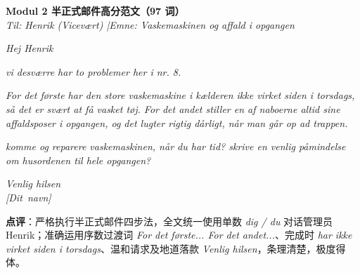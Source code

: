 \begin{answerbox}
\textbf{Modul 2 半正式邮件高分范文（97 词）}\\
\textit{Til: Henrik (Vicevært) \quad|\quad Emne: Vaskemaskinen og affald i opgangen}

\textit{Hej Henrik}

\textit{ vi desværre har to problemer her i nr. 8.}

\textit{For det første har den store vaskemaskine i kælderen ikke virket siden i torsdags, så det er svært at få vasket tøj. For det andet stiller en af naboerne altid sine affaldsposer i opgangen, og det lugter rigtig dårligt, når man går op ad trappen.}

\textit{ komme og reparere vaskemaskinen, når du har tid?  skrive en venlig påmindelse om husordenen til hele opgangen?}

\textit{}

\textit{Venlig hilsen\\
\mbox{[Dit navn]}}

\small\textbf{点评}：严格执行半正式邮件四步法，全文统一使用单数 \textit{dig / du} 对话管理员 Henrik；准确运用序数过渡词 \textit{For det første... For det andet...}、完成时 \textit{har ikke virket siden i torsdags}、温和请求及地道落款 \textit{Venlig hilsen}，条理清楚，极度得体。
\end{answerbox}
